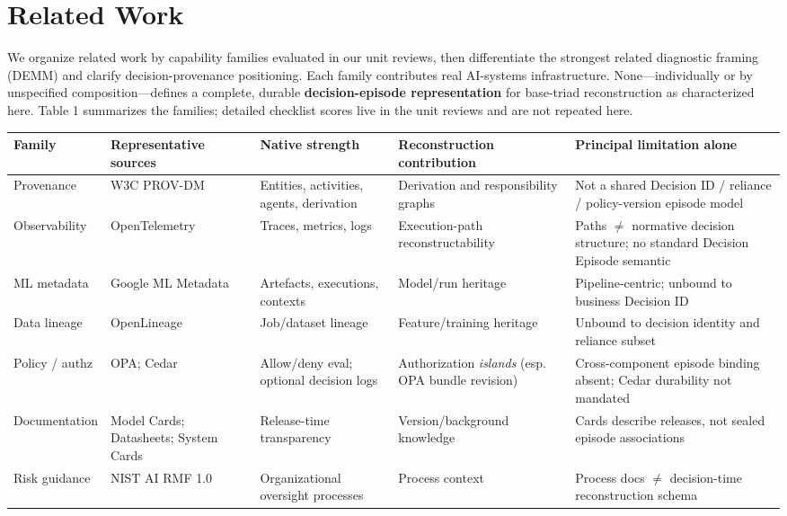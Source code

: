 \documentclass[11pt,a4paper]{article}
\begin{document}
\section{Related Work}

We organize related work by capability families evaluated in our unit reviews, then differentiate the strongest related diagnostic framing (DEMM) and clarify decision-provenance positioning. Each family contributes real AI-systems infrastructure. None---individually or by unspecified composition---defines a complete, durable \textbf{decision-episode representation} for base-triad reconstruction as characterized here. Table 1 summarizes the families; detailed checklist scores live in the unit reviews and are not repeated here.




\begin{table}[t]
\centering
\small
\begin{tabularx}{\textwidth}{|X|X|X|X|X|}
\hline
 Family & Representative sources & Native strength & Reconstruction contribution & Principal limitation alone \\
 \hline
 \hline
 Provenance & W3C PROV-DM & Entities, activities, agents, derivation & Derivation and responsibility graphs & Not a shared Decision ID / reliance / policy-version episode model \\
 \hline
 Observability & OpenTelemetry & Traces, metrics, logs & Execution-path reconstructability & Paths $\neq$ normative decision structure; no standard Decision Episode semantic \\
 \hline
 ML metadata & Google ML Metadata & Artefacts, executions, contexts & Model/run heritage & Pipeline-centric; unbound to business Decision ID \\
 \hline
 Data lineage & OpenLineage & Job/dataset lineage & Feature/training heritage & Unbound to decision identity and reliance subset \\
 \hline
 Policy / authz & OPA; Cedar & Allow/deny eval; optional decision logs & Authorization \emph{islands} (esp. OPA bundle revision) & Cross-component episode binding absent; Cedar durability not mandated \\
 \hline
 Documentation & Model Cards; Datasheets; System Cards & Release-time transparency & Version/background knowledge & Cards describe releases, not sealed episode associations \\
 \hline
 Risk guidance & NIST AI RMF 1.0 & Organizational oversight processes & Process context & Process docs $\neq$ decision-time reconstruction schema \\

\end{tabularx}
\end{table}
\end{document}
